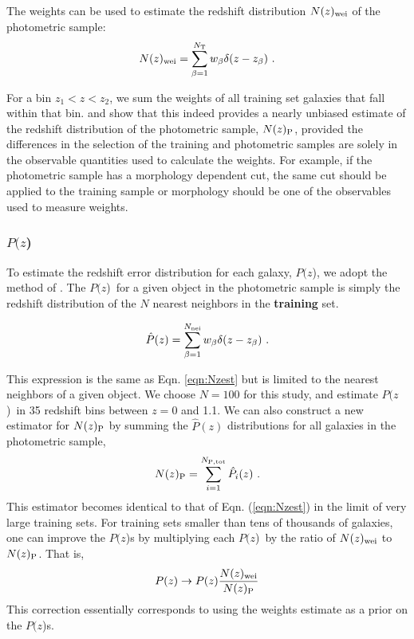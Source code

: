 \documentclass[12pt,preprint]{aastex}
\newcommand{\pofz}{$P(z$)}
\newcommand{\nwei}{N(z)_{\rm wei}}
\newcommand{\npz}{N(z)_{\rm P}}
\begin{document}
The weights can be used to estimate the redshift distribution $\nwei$ of the
photometric sample:
\begin{equation}  
\nwei = \sum_{\beta=1}^{N_{\rm T}} w_\beta \delta(z-z_\beta)~.
\label{eqn:Nzest}
\end{equation}

\noindent For a bin $z_1 < z < z_2$, we sum the weights of all training set
galaxies that fall within that bin.  \cite{LimaPhotoz08} and
\cite{CunhaPhotoz09} show that this indeed provides a nearly unbiased estimate
of the redshift distribution of the photometric sample, $N(z)_{\rm P}$,
provided the differences in the selection of the training and photometric
samples are solely in the observable quantities used to calculate the weights.
For example, if the photometric sample has a morphology dependent cut,
the same cut should be applied to the training sample or morphology should be one of
the observables used to measure weights.


\subsubsection{\pofz}

To estimate the redshift error distribution for each galaxy, \pofz,
we adopt the method of \cite{CunhaPhotoz09}. The \pofz\ for a given object in the
photometric sample is simply the redshift distribution of the $N$
nearest neighbors in the {\bf training} set.

\begin{equation}
\hat{P}(z) = \sum_{\beta=1}^{N_{\rm nei}} w_\beta \delta(z-z_\beta)~.
\label{eqn:pzest}
\end{equation}

\noindent This expression is the same as Eqn. \ref{eqn:Nzest} but is limited to
the nearest neighbors of a given object.  We choose $N=100$ for this study, and
estimate \pofz\ in 35 redshift bins between $z=0$ and 1.1.  We can also
construct a new estimator for $N(z)_{\rm P}$ by summing the $\hat{P}(z)$
distributions for all galaxies in the photometric sample,
\begin{equation}
\npz = \sum_{i=1}^{N_{\rm P,tot}}\hat{P}_i(z)~.
\label{eqn:Nhat2}
\end{equation}
\noindent This estimator becomes identical to that of Eqn. (\ref{eqn:Nzest})
in the limit of very large training sets.  For training sets smaller than tens
of thousands of galaxies, one can improve the \pofz s by multiplying each \pofz\ by the
ratio of $\nwei$ to $\npz$.
That is,
\begin{equation} \label{eq:pzcorrect}
P(z) \rightarrow P(z)\frac{\nwei}{\npz} \label{eqn:pzcorrect}
\end{equation}
This correction essentially corresponds to using the weights estimate as a
prior on the \pofz s.
\end{document}

